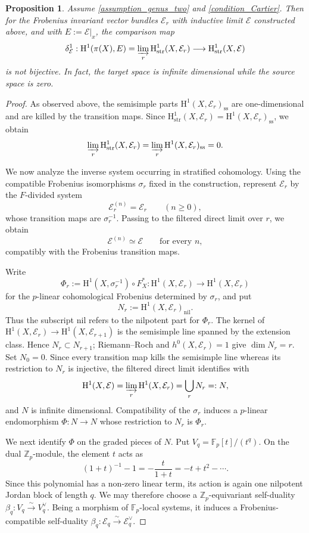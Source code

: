 \documentclass[12pt,a4]{amsart}
\newtheorem{prop}[claim]{Proposition}
\theoremstyle{definition}
\begin{document}
\begin{prop}\label{prop-non-example}
Assume \eqref{assumption_genus_two} and \eqref{condition_Cartier}. Then
for the Frobenius invariant vector bundles $\mathcal E_r$ with inductive limit
$\mathcal E$ constructed above, and with $E:=\mathcal E|_x$, the comparison map
\[
\delta^1_\mathcal{E}: \mathrm{H}^1(\pi(X),E)=
\varinjlim_r \mathrm{H}^1_\mathrm{str}(X,\mathcal E_r)\longrightarrow
\mathrm{H}^1_\mathrm{str}(X,\mathcal E)
\]
is not bijective. In fact, the target space is infinite dimensional while the source space 
is zero. 
\end{prop} 
\begin{proof}
As observed above, the semisimple parts
$\mathrm H^1(X,\mathcal E_r)_\mathrm{ss}$ are one-dimensional and are
killed by the transition maps. Since
$\mathrm H^1_\mathrm{str}(X,\mathcal E_r)=
\mathrm H^1(X,\mathcal E_r)_\mathrm{ss}$, we obtain
\[
\varinjlim_r \mathrm H^1_\mathrm{str}(X,\mathcal E_r)
=\varinjlim_r \mathrm H^1(X,\mathcal E_r)_\mathrm{ss}=0.
\]

We now analyze the inverse system occurring in stratified cohomology.  Using
the compatible Frobenius isomorphisms $\sigma_r$ fixed in the construction,
represent $\mathcal E_r$ by the $F$-divided system
\[
\mathcal E_r^{(n)}=\mathcal E_r\qquad (n\geq 0),
\]
whose transition maps are $\sigma_r^{-1}$. Passing to the filtered direct limit over $r$, we obtain
\[
\mathcal E^{(n)}\simeq\mathcal E\qquad\text{for every }n,
\]
compatibly with the Frobenius transition maps.

Write
\[
\Phi_r:=\mathrm H^1(X,\sigma_r^{-1})\circ F_X^*
:\mathrm H^1(X,\mathcal E_r)\longrightarrow
\mathrm H^1(X,\mathcal E_r)
\]
for the $p$-linear cohomological Frobenius determined by $\sigma_r$, and put
\[
N_r:=\mathrm H^1(X,\mathcal E_r)_\mathrm{nil}.
\]
Thus the subscript $\mathrm{nil}$ refers to the nilpotent part for $\Phi_r$.
The kernel of $\mathrm H^1(X,\mathcal E_r)\to\mathrm H^1(X,\mathcal E_{r+1})$
is the semisimple line spanned by the extension class. Hence $N_r\subset N_{r+1}$;
Riemann--Roch and $h^0(X,\mathcal E_r)=1$ give $\dim N_r=r$. Set $N_0=0$. Since every transition map kills the semisimple line whereas its restriction
to $N_r$ is injective, the filtered direct limit identifies with
\[
\mathrm H^1(X,\mathcal E)=\varinjlim_r\mathrm H^1(X,\mathcal E_r)
=\bigcup_rN_r=:N,
\]
and $N$ is infinite dimensional.  Compatibility of the $\sigma_r$ induces a
$p$-linear endomorphism $\Phi:N\to N$ whose restriction to $N_r$ is
$\Phi_r$.

We next identify $\Phi$ on the graded pieces of $N$. Put
$V_q=\mathbb F_p[t]/(t^q)$. On the dual $\mathbb Z_p$-module, the element $t$
acts as
\[
(1+t)^{-1}-1=-\frac{t}{1+t}=-t+t^2-\cdots.
\]
Since this polynomial has a non-zero linear term, its action is again one
nilpotent Jordan block of length $q$.
We may therefore choose a $\mathbb Z_p$-equivariant self-duality
$\beta_q:V_q\xrightarrow{\sim}V_q^\vee$. Being a morphism of
$\mathbb F_p$-local systems, it induces a Frobenius-compatible self-duality
$\beta_q:\mathcal E_q\xrightarrow{\sim}\mathcal E_q^\vee$.


\end{proof}
\end{document}

